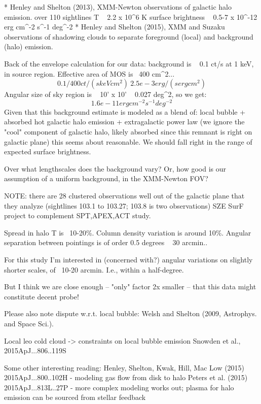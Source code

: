 * Henley and Shelton (2013), XMM-Newton observations of galactic halo emission.
  over 110 sightlines
    T ~ 2.2 x 10^6 K
    surface brightness ~ 0.5-7 x 10^{-12} erg cm^{-2} s^{-1} deg^{-2}
* Henley and Shelton (2015), XMM and Suzaku observations of shadowing clouds
  to separate foreground (local) and background (halo) emission.

Back of the envelope calculation for our data:
background is ~ 0.1 ct/s at 1 keV, in source region.
Effective area of MOS is ~400 cm^2...
\[
    0.1/400 ct/(s keV cm^2) ~ 2.5e-3 erg / (s erg cm^2)
\]
Angular size of sky region is ~ 10' x 10' ~ 0.027 deg^2, so we get:
\[
    1.6e-11 erg cm^{-2} s^{-1} deg^{-2}
\]
Given that this background estimate is modeled as a blend of:
local bubble + absorbed hot galactic halo emission + extragalactic power law
(we ignore the "cool" component of galactic halo, likely absorbed since
this remnant is right on galactic plane)
this seems about reasonable.  We should fall right in the range of expected
surface brightness.


Over what lengthscales does the background vary?  Or, how good is our
assumption of a uniform background, in the XMM-Newton FOV?

NOTE: there are 28 clustered observations well out of the galactic plane
that they analyze (sightlines 103.1 to 103.27; 103.8 is two observations)
SZE SurF project to complement SPT,APEX,ACT study.

    Spread in halo T is ~10-20\%.  Column density variation is around 10\%.
    Angular separation between pointings is of order 0.5 degrees ~ 30 arcmin..

    For this study I'm interested in (concerned with?)
    angular variations on slightly shorter scales, of ~10-20 arcmin.  I.e.,
    within a half-degree.

    But I think we are close enough -- "only" factor 2x smaller -- that this
    data might constitute decent probe!



Please also note dispute w.r.t. local bubble: Welsh and Shelton (2009,
Astrophys. and Space Sci.).

Local leo cold cloud -> constraints on local bubble emission
Snowden et al., 2015ApJ...806..119S

Some other interesting reading:
Henley, Shelton, Kwak, Hill, Mac Low (2015) 2015ApJ...800..102H
- modeling gas flow from disk to halo
Peters et al. (2015) 2015ApJ...813L..27P
- more complex modeling works out; plasma for halo emission can be sourced from
  stellar feedback

